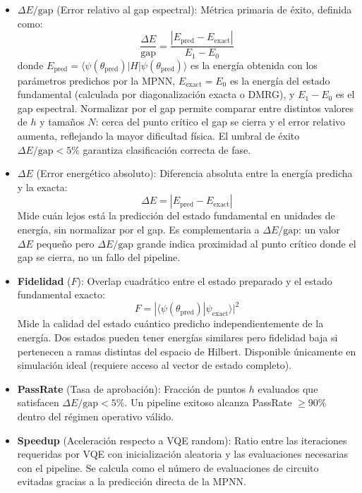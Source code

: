 \documentclass[11pt,a4paper,spanish]{book}
\begin{document}
\begin{itemize}
    \item \textbf{$\Delta E/\text{gap}$} (Error relativo al gap espectral): Métrica primaria de éxito, definida como:
    \begin{equation}
    \frac{\Delta E}{\text{gap}} = \frac{|E_{\text{pred}} - E_{\text{exact}}|}{E_1 - E_0}
    \end{equation}
    donde $E_{\text{pred}} = \langle \psi(\theta_{\text{pred}}) | H | \psi(\theta_{\text{pred}}) \rangle$ es la energía obtenida con los parámetros predichos por la MPNN, $E_{\text{exact}} = E_0$ es la energía del estado fundamental (calculada por diagonalización exacta o DMRG), y $E_1 - E_0$ es el gap espectral. Normalizar por el gap permite comparar entre distintos valores de $h$ y tamaños $N$: cerca del punto crítico el gap se cierra y el error relativo aumenta, reflejando la mayor dificultad física. El umbral de éxito $\Delta E/\text{gap} < 5\%$ garantiza clasificación correcta de fase.

    \item \textbf{$\Delta E$} (Error energético absoluto): Diferencia absoluta entre la energía predicha y la exacta:
    \begin{equation}
    \Delta E = |E_{\text{pred}} - E_{\text{exact}}|
    \end{equation}
    Mide cuán lejos está la predicción del estado fundamental en unidades de energía, sin normalizar por el gap. Es complementaria a $\Delta E/\text{gap}$: un valor $\Delta E$ pequeño pero $\Delta E/\text{gap}$ grande indica proximidad al punto crítico donde el gap se cierra, no un fallo del pipeline.

    \item \textbf{Fidelidad} ($F$): Overlap cuadrático entre el estado preparado y el estado fundamental exacto:
    \begin{equation}
    F = |\langle \psi(\theta_{\text{pred}}) | \psi_{\text{exact}} \rangle|^2
    \end{equation}
    Mide la calidad del estado cuántico predicho independientemente de la energía. Dos estados pueden tener energías similares pero fidelidad baja si pertenecen a ramas distintas del espacio de Hilbert. Disponible únicamente en simulación ideal (requiere acceso al vector de estado completo).

    \item \textbf{PassRate} (Tasa de aprobación): Fracción de puntos $h$ evaluados que satisfacen $\Delta E/\text{gap} < 5\%$. Un pipeline exitoso alcanza PassRate $\geq 90\%$ dentro del régimen operativo válido.

    \item \textbf{Speedup} (Aceleración respecto a VQE random): Ratio entre las iteraciones requeridas por VQE con inicialización aleatoria y las evaluaciones necesarias con el pipeline. Se calcula como el número de evaluaciones de circuito evitadas gracias a la predicción directa de la MPNN.

\end{itemize}
\end{document}
